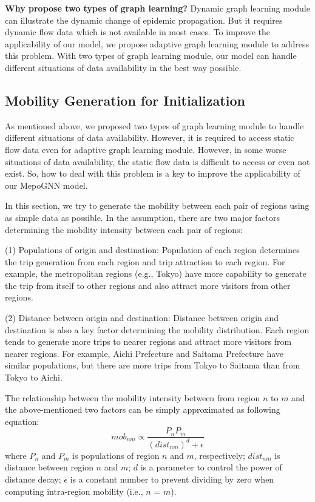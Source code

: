 \documentclass[lettersize,journal]{IEEEtran}
\begin{document}
\noindent\textbf{Why propose two types of graph learning?} Dynamic graph learning module can illustrate the dynamic change of epidemic propagation. But it requires dynamic flow data which is not available in most cases. To improve the applicability of our model, we propose adaptive graph learning module to address this problem. With two types of graph learning module, our model can handle different situations of data availability in the best way possible. 

\subsection{Mobility Generation for Initialization}
As mentioned above, we proposed two types of graph learning module to handle different situations of data availability. However, it is required to access static flow data even for adaptive graph learning module. However, in some worse situations of data availability, the static flow data is difficult to access or even not exist. So, how to deal with this problem is a key to improve the applicability of our MepoGNN model. 

In this section, we try to generate the mobility between each pair of regions using as simple data as possible. In the assumption, there are two major factors determining the mobility intensity between each pair of regions: 

(1) Populations of origin and destination: Population of each region determines the trip generation from each region and trip attraction to each region. For example, the metropolitan regions (e.g., Tokyo) have more capability to generate the trip from itself to other regions and also attract more visitors from other regions.

(2) Distance between origin and destination: Distance between origin and destination is also a key factor determining the mobility distribution. Each region tends to generate more trips to nearer regions and attract more visitors from nearer regions. For example, Aichi Prefecture and Saitama Prefecture have similar populations, but there are more trips from Tokyo to Saitama than from Tokyo to Aichi. 

The relationship between the mobility intensity between from region $n$ to $m$ and the above-mentioned two factors can be simply approximated as following equation:
\begin{equation}
    mob_{nm} \propto \frac{P_n P_m}{(dist_{nm})^d + \epsilon}
\end{equation}
where $P_n$ and $P_m$ is populations of region $n$ and $m$, respectively; $dist_{nm}$ is distance between region $n$ and $m$; $d$ is a parameter to control the power of distance decay; $\epsilon$ is a constant number to prevent dividing by zero when computing intra-region mobility (i.e., $n$ = $m$).
\end{document}
